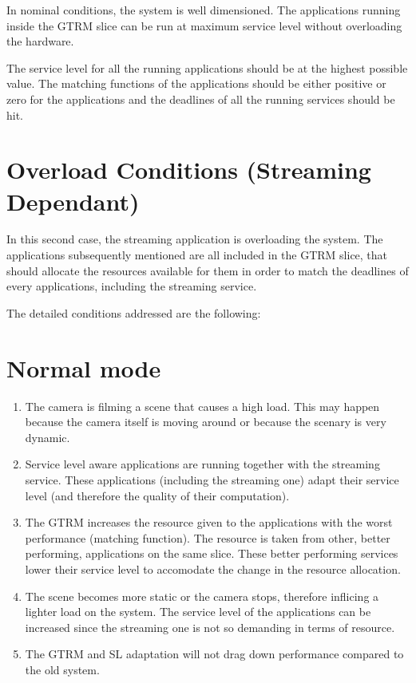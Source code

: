 \documentclass[nobiblatex]{LTHthesis}
\begin{document}
In nominal conditions, the system is well dimensioned. The applications
running inside the GTRM slice can be run at maximum service level without 
overloading the hardware.

The service level for all the running applications should be at the
highest possible value. The matching functions of the applications should
be either positive or zero for the applications and the deadlines of all
the running services should be hit.

\section{Overload Conditions (Streaming Dependant)}

In this second case, the streaming application is overloading the system.
The applications subsequently mentioned are all included in the GTRM slice,
that should allocate the resources available for them in order to match
the deadlines of every applications, including the streaming service.

The detailed conditions addressed are the following:
\section{Normal mode}
\begin{enumerate}
\item The camera is filming a scene that causes a high load. This may happen
  because the camera itself is moving around or because the scenary is
  very dynamic.
\item Service level aware applications are running together with the
  streaming service. These applications (including the streaming one) adapt
  their service level (and therefore the quality of their computation).
\item The GTRM increases the resource given to the applications with the
  worst performance (matching function). The resource is taken from other,
  better performing, applications on the same slice. These better performing
  services lower their service level to accomodate the change in the resource
  allocation.
\item The scene becomes more static or the camera stops, therefore inflicing
  a lighter load on the system. The service level of the applications can be
  increased since the streaming one is not so demanding in terms of resource.
\item The GTRM and SL adaptation will not drag down performance compared to the old system.
\end{enumerate}
\end{document}
